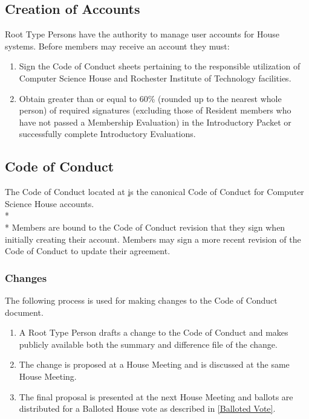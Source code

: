 \documentclass{article}
\newcommand{\bsection}[1]{\subsection{#1} \label{#1}}
\newcommand{\bsubsection}[1]{\subsubsection{#1} \label{#1}}
\begin{document}
\bsection{Creation of Accounts}
Root Type Persons have the authority to manage user accounts for House systems. Before members may receive an account they must:
\renewcommand{\theenumi}{\alph{enumi}} %
\begin{enumerate}
	\item Sign the Code of Conduct sheets pertaining to the responsible utilization of Computer Science House and Rochester Institute of Technology facilities.
	\item Obtain greater than or equal to 60\% (rounded up to the nearest whole person) of required signatures (excluding those of Resident members who have not passed a Membership Evaluation) in the Introductory Packet or successfully complete Introductory Evaluations.
\end{enumerate}

\bsection{Code of Conduct}
The Code of Conduct located at \href{https://github.com/ComputerScienceHouse/CodeOfConduct} is the canonical Code of Conduct for Computer Science House accounts.
\\* \\*
Members are bound to the Code of Conduct revision that they sign when initially creating their account. Members may sign a more recent revision of the Code of Conduct to update their agreement.
\bsubsection{Changes}
The following process is used for making changes to the Code of Conduct document.
\begin{enumerate}
	\item A Root Type Person drafts a change to the Code of Conduct and makes publicly available both the summary and difference file of the change.
	\item The change is proposed at a House Meeting and is discussed at the same House Meeting.
	\item The final proposal is presented at the next House Meeting and ballots are distributed for a Balloted House vote as described in \ref{Balloted Vote}.
\end{enumerate}
\end{document}
